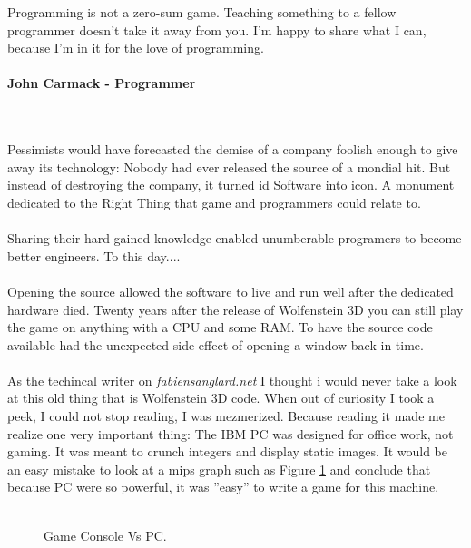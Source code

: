  \begin{fancyquotes}
   Programming is not a zero-sum game. Teaching something to a fellow programmer doesn't take it away from you. I'm happy to share what I can, because I'm in it for the love of programming.\\
   \\
\textbf{John Carmack - Programmer}
 \end{fancyquotes}\\
\\
Pessimists would have forecasted the demise of a company foolish enough to give away its technology: Nobody had ever released the source of a mondial hit. But instead of destroying the company, it turned id Software into icon. A monument dedicated to the Right Thing that game and programmers could relate to.\\
\\
Sharing their hard gained knowledge enabled unumberable programers to become better engineers. To this day.... \\
\\
Opening the source allowed the software to live and run well after the dedicated hardware died. Twenty years after the release of Wolfenstein 3D you can still play the game on anything with a CPU and some RAM. To have the source code available had the unexpected side effect of opening a window back in time.\\
\\
As the techincal writer on \emph{fabiensanglard.net} I thought i would never take a look at this old thing that is Wolfenstein 3D code. When out of curiosity I took a peek, I could not stop reading, I was mezmerized. Because reading it made me realize one very important thing: The IBM PC was designed for office work, not gaming. It was meant to crunch integers and display static images. It would be an easy mistake to look at a mips graph such as Figure \ref{fig:game_console_vs_PC} and conclude that because PC were so powerful, it was ''easy'' to write a game for this machine. \\
\\
\begin{figure}[H]
\centering
   \caption{Game Console Vs PC.} \label{fig:game_console_vs_PC}
 \end{figure}
 

